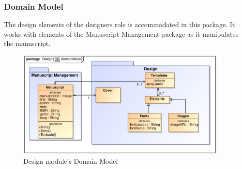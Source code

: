 \newpage
\subsubsection{Domain Model}
\par{The design elements of the designers role is accommodated in this package. It works with elements of the Manuscript Management package as it manipulates the manuscript. }

\begin{figure}[h]
\centering
\includegraphics[scale=0.8,width=400px]{epsImages/DomainModels/DesignDomainModel.eps}
\caption{Design module's Domain Model}
\end{figure}
